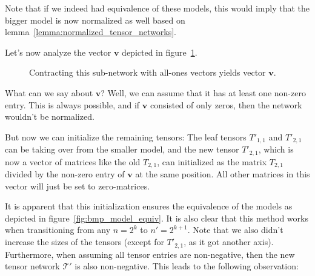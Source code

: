 \documentclass[../../main.tex]{subfiles}
\begin{document}
    Note that if we indeed had equivalence of these models, this would imply that the bigger model is now normalized as well based on lemma~\ref{lemma:normalized_tensor_networks}.

    Let's now analyze the vector $\bm{v}$ depicted in figure~\ref{fig:sufficient_condition_bmp}.

    \begin{figure}[h]
        \centering
        \caption{Contracting this sub-network with all-ones vectors yields vector $\bm{v}$.}
        \label{fig:sufficient_condition_bmp}
    \end{figure}

    What can we say about $\bm{v}$? Well, we can assume that it has at least one non-zero entry. This is always possible, and if $\bm{v}$ consisted of only zeros, then the network wouldn't be normalized.

    But now we can initialize the remaining tensors: The leaf tensors $T'_{1,1}$ and $T'_{2,1}$ can be taking over from the smaller model, and the new tensor $T'_{2, 1}$, which is now a vector of matrices like the old $T_{2, 1}$, can initialized as the matrix $T_{2, 1}$ divided by the non-zero entry of $\bm{v}$ at the same position. All other matrices in this vector will just be set to zero-matrices.

    It is apparent that this initialization ensures the equivalence of the models as depicted in figure~\ref{fig:bmp_model_equiv}. It is also clear that this method works when transitioning from any $n = 2^k$ to $n' = 2^{k+1}$. Note that we also didn't increase the sizes of the tensors (except for $T'_{2, 1}$, as it got another axis). Furthermore, when assuming all tensor entries are non-negative, then the new tensor network $\mathcal{T}'$ is also non-negative. This leads to the following observation:
\end{document}
